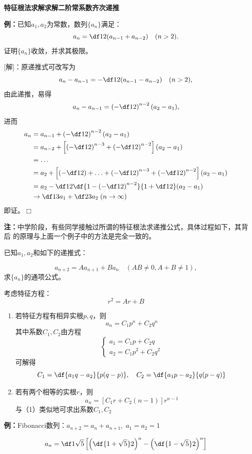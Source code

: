 \begin{shaded}
	{\bf 特征根法求解求解二阶常系数齐次递推}

	{\bf 例：}已知$a_1,a_2$为常数，数列$\{a_n\}$满足：
	$$a_n=\df 12({a_{n-1}+a_{n-2}})\quad(n>2).$$
	证明$\{a_n\}$收敛，并求其极限。

	[解]：原递推式可改写为
	$$a_n-a_{n-1}=-\df12(a_{n-1}-a_{n-2})\quad(n>2),$$
	由此递推，易得
	$$a_n-a_{n-1}=\left(-\df12\right)^{n-2}(a_2-a_1),$$
	进而
	\begin{align}
		a_n&=a_{n-1}+\left(-\df12\right)^{n-2}(a_2-a_1)\notag\\
		&=a_{n-2}+\left[\left(-\df12\right)^{n-3}+\left(-\df12\right)^{n-2}\right]
		(a_2-a_1)\notag\\
		&=\ldots\notag\\
		&=a_2+\left[\left(-\df12\right)+\ldots+\left(-\df12\right)^{n-3}
		+\left(-\df12\right)^{n-2}\right](a_2-a_1)\notag\\
		&=a_2-\df12\df{1-\left(-\df12\right)^{n-2}}{1+\df12}(a_2-a_1)\notag\\
		&\to\df13a_1+\df23a_2\;(n\to\infty)\notag
	\end{align}
	即证。\hfill$\Box$

	{\bf 注：}中学阶段，有些同学接触过所谓的特征根法求递推公式，具体过程如下，其背后
	的原理与上面一个例子中的方法是完全一致的。

	已知$a_1,a_2$和如下的递推式：

	$$a_{n+2}=Aa_{n+1}+Ba_n\quad (AB\ne 0, A+B\ne 1),$$
	求$\{a_n\}$的通项公式。

	考虑特征方程：
	$$r^2=Ar+B$$
	\begin{enumerate}[(1)]
	  \setlength{\itemindent}{1cm}
	  \item 若特征方程有相异实根$p,q$，则
	  $$a_n=C_1p^n+C_2q^n$$
	  其中系数$C_1,C_2$由方程
	  $$\left\{\begin{array}{l}
	  a_1=C_1p+C_2q\\
	  a_2=C_1p^2+C_2q^2
	  \end{array}\right.$$
	  可解得
	  $$C_1=\df{a_1q-a_2}{p(q-p)},\quad
	  C_2=\df{a_1p-a_2}{q(p-q)}$$
	  \item 若有两个相等的实根$r$，则
	  $$a_n=[C_1r+C_2(n-1)]r^{n-1}$$
	  与（1）类似地可求出系数$C_1,C_2$
	\end{enumerate}

	{\bf 例：}Fibonacci数列：$a_{n+2}=a_n+a_{n+1},\;a_1=a_2=1$

	$$a_n=\df1{\sqrt5}\left[\left(\df{1+\sqrt5}2\right)^n
	-\left(\df{1-\sqrt5}2\right)^n\right]$$

\end{shaded}

